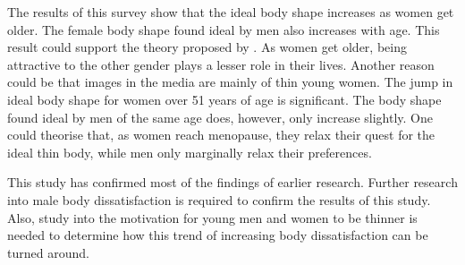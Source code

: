 \documentclass[a4paper, jou, 11pt]{apa6}
\begin{document}
The results of this survey show that the ideal body shape increases as women get older. The female body shape found ideal by men also increases with age. This result could support the theory proposed by . As women get older, being attractive to the other gender plays a lesser role in their lives. Another reason could be that images in the media are mainly of thin young women. The jump in ideal body shape for women over 51 years of age is significant. The body shape found ideal by men of the same age does, however, only increase slightly. One could theorise that, as women reach menopause, they relax their quest for the ideal thin body, while men only marginally relax their preferences.

This study has confirmed most of the findings of earlier research. Further research into male body dissatisfaction is required to confirm the results of this study. Also, study into the motivation for young men and women to be thinner is needed to determine how this trend of increasing body dissatisfaction can be turned around.



\end{document}
